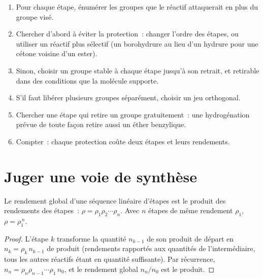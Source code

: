 \begin{method}\label{met:b2:retrosynthesis:protect-in-route}
\begin{enumerate}
  \item Pour chaque étape, énumérer les groupes que le réactif attaquerait en plus du groupe visé.
  \item Chercher d'abord à éviter la protection~: changer l'ordre des étapes, ou utiliser un réactif plus
        sélectif (un borohydrure au lieu d'un hydrure pour une cétone voisine d'un ester).
  \item Sinon, choisir un groupe stable à chaque étape jusqu'à son retrait, et retirable dans des
        conditions que la molécule supporte.
  \item S'il faut libérer plusieurs groupes séparément, choisir un jeu orthogonal.
  \item Chercher une étape qui retire un groupe gratuitement~: une hydrogénation prévue de toute façon
        retire aussi un éther benzylique.
  \item Compter~: chaque protection coûte deux étapes et leurs rendements.
\end{enumerate}
\end{method}

\section{Juger une voie de synthèse}\label{sec:b2:retrosynthesis:judging}

\begin{proposition}\label{prop:b2:retrosynthesis:overall-yield}
Le rendement global d'une séquence linéaire d'étapes est le produit des rendements des étapes~:
$\rho = \rho_1 \rho_2 \cdots \rho_n$. Avec $n$ étapes de même rendement $\rho_1$, $\rho = \rho_1^{\,n}$.
\end{proposition}

\begin{proof}
L'étape $k$ transforme la quantité $n_{k-1}$ de son produit de départ en $n_k = \rho_k\, n_{k-1}$ de
produit (rendements rapportés aux quantités de l'intermédiaire, tous les autres réactifs étant en
quantité suffisante). Par récurrence,
$n_n = \rho_n \rho_{n-1} \cdots \rho_1\, n_0$, et le rendement global $n_n/n_0$ est le produit.
\end{proof}


